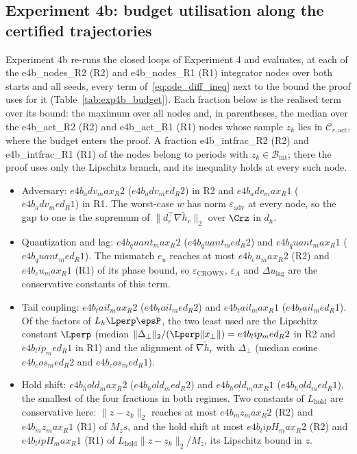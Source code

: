 \subsection{Experiment 4b: budget utilisation along the certified trajectories}
Experiment 4b re-runs the closed loops of Experiment 4 and evaluates, at each of the {{e4b_nodes_R2}} (R2) and
{{e4b_nodes_R1}} (R1) integrator nodes over both starts and all seeds, every term of~\eqref{eq:ode_diff_ineq} next to
the bound the proof uses for it (Table~\ref{tab:exp4b_budget}). Each fraction below is the realised term over its
bound: the maximum over all nodes and, in parentheses, the median over the {{e4b_act_R2}} (R2) and {{e4b_act_R1}} (R1)
nodes whose sample \(z_k\) lies in \(\mathcal C_{r,\mathrm{act}}\), where the budget enters the proof. A fraction
{{e4b_intfrac_R2}} (R2) and {{e4b_intfrac_R1}} (R1) of the nodes belong to periods with \(z_k \in \mathcal B_{\mathrm{int}}\);
there the proof uses only the Lipschitz branch, and its inequality holds at every such node.
\begin{itemize}
\item Adversary: \({{e4b_adv_max_R2}}\) (\({{e4b_adv_med_R2}}\)) in R2 and \({{e4b_adv_max_R1}}\) (\({{e4b_adv_med_R1}}\))
in R1. The worst-case \(w\) has norm \(\varepsilon_{\mathrm{adv}}\) at every node, so the gap to one is the supremum
of \(\|d_r^\top\nabla\tilde h_r\|_2\) over \(\Crz\) in \(\overline d_h\).
\item Quantization and lag: \({{e4b_quant_max_R2}}\) (\({{e4b_quant_med_R2}}\)) and \({{e4b_quant_max_R1}}\)
(\({{e4b_quant_med_R1}}\)). The mismatch \(e_u\) reaches at most \({{e4b_eu_max_R2}}\) (R2) and \({{e4b_eu_max_R1}}\) (R1)
of its phase bound, so \(\varepsilon_{\mathrm{CROWN}}\), \(\varepsilon_A\) and \(\Delta u_{\mathrm{lag}}\) are the conservative constants of this term.
\item Tail coupling: \({{e4b_tail_max_R2}}\) (\({{e4b_tail_med_R2}}\)) and \({{e4b_tail_max_R1}}\) (\({{e4b_tail_med_R1}}\)).
Of the factors of \(L_h\Lperp\epsP\), the two least used are the Lipschitz constant \(\Lperp\) (median
\(\|\Delta_\perp\|_2/(\Lperp\|x_\perp\|) = {{e4b_lip_med_R2}}\) in R2 and \({{e4b_lip_med_R1}}\) in R1) and the
alignment of \(\nabla\tilde h_r\) with \(\Delta_\perp\) (median cosine \({{e4b_cos_med_R2}}\) and \({{e4b_cos_med_R1}}\)).
\item Hold shift: \({{e4b_hold_max_R2}}\) (\({{e4b_hold_med_R2}}\)) and \({{e4b_hold_max_R1}}\) (\({{e4b_hold_med_R1}}\)), the
smallest of the four fractions in both regimes. Two constants of \(L_{\mathrm{hold}}\) are conservative here:
\(\|z - z_k\|_2\) reaches at most \({{e4b_mz_max_R2}}\) (R2) and \({{e4b_mz_max_R1}}\) (R1) of \(M_z s\), and the hold shift
at most \({{e4b_lipH_max_R2}}\) (R2) and \({{e4b_lipH_max_R1}}\) (R1) of
\(L_{\mathrm{hold}}\|z - z_k\|_2/M_z\), its Lipschitz bound in \(z\).
\end{itemize}

